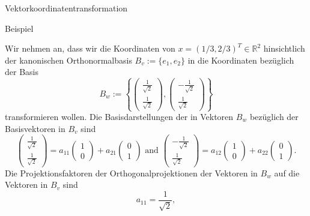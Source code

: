 \documentclass[
  8pt,
  ignorenonframetext,
]{beamer}
\begin{document}
\begin{frame}{Vektorkoordinatentransformation}
\protect\hypertarget{vektorkoordinatentransformation-6}{}
\vspace{2mm}

Beispiel \vspace{1mm}

\footnotesize

Wir nehmen an, dass wir die Koordinaten von
\(x = (1/3, 2/3)^T \in \mathbb{R}^2\) hinsichtlich der kanonischen
Orthonormalbasis \(B_v :=\{e_1,e_2\}\) in die Koordinaten bezüglich der
Basis \begin{equation}
B_w :=
\left\lbrace
\begin{pmatrix}
\frac{1}{\sqrt{2}} \\ \frac{1}{\sqrt{2}}
\end{pmatrix},
\begin{pmatrix}
-\frac{1}{\sqrt{2}} \\ \frac{1}{\sqrt{2}}
\end{pmatrix}
\right\rbrace
\end{equation} transformieren wollen. Die Basisdarstellungen der in
Vektoren \(B_w\) bezüglich der Basisvektoren in \(B_v\) sind
\begin{equation}
\begin{pmatrix}
\frac{1}{\sqrt{2}} \\ \frac{1}{\sqrt{2}}
\end{pmatrix}
=
a_{11}
\begin{pmatrix}
1 \\ 0
\end{pmatrix}
+
a_{21}
\begin{pmatrix}
0 \\ 1
\end{pmatrix}
\mbox{ and }
\begin{pmatrix}
-\frac{1}{\sqrt{2}} \\ \frac{1}{\sqrt{2}}
\end{pmatrix}
=
a_{12}
\begin{pmatrix}
1 \\ 0
\end{pmatrix}
+
a_{22}
\begin{pmatrix}
0 \\ 1
\end{pmatrix}.
\end{equation} Die Projektionsfaktoren der Orthogonalprojektionen der
Vektoren in \(B_w\) auf die Vektoren in \(B_v\) sind \begin{equation}
a_{11} =  \frac{1}{\sqrt{2}},

\end{equation}
\end{frame}
\end{document}
